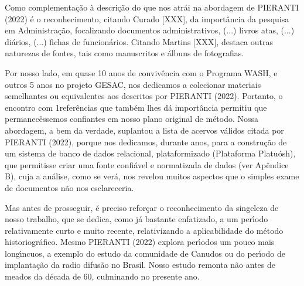 \documentclass[
12pt,		%
openright,	%
twoside,  %
a4paper,			%
chapter=TITLE,		%
english,			%
french,				%
spanish,			%
brazil				%
]{USPSC-classe/USPSC}
\begin{document}
Como complementa\c{c}\~ao \`a descri\c{c}\~ao do que nos atr\'ai na abordagem de  PIERANTI (2022) \'e o reconhecimento, citando Curado [XXX], da import\^ancia da pesquisa em Administra\c{c}\~ao, focalizando \textquotedbl documentos administrativos, (...) livros atas, (...) di\'arios, (...) fichas de funcion\'arios\textquotedbl . Citando Martins [XXX], destaca outras naturezas de fontes, tais como manuscritos e \'albuns de fotografias.

















Por nosso lado, em quase 10 anos de conviv\^encia com o Programa WASH, e outros 5 anos no projeto GESAC, nos dedicamos a colecionar materiais semelhantes ou equivalentes aos descritos por PIERANTI (2022). Portanto, o encontro com 1refer\^encias que tamb\'em lhes d\'a import\^ancia permitiu que permanec\^essemos confiantes em nosso plano original de m\'etodo. Nossa abordagem, a bem da verdade, suplantou a lista de acervos v\'alidos citada por  PIERANTI (2022), porque nos dedicamos, durante anos, para a constru\c{c}\~ao de um sistema de banco de dados relacional, plataformizado (Plataforma Platu\'osh), que permitisse criar uma fonte confi\'avel e normatizada de dados (ver Ap\^endice B), cuja a an\'alise, como se ver\'a, nos revelou muitos aspectos que o simples exame de documentos n\~ao nos esclareceria.

















Mas antes de prosseguir, \'e preciso refor\c{c}ar o reconhecimento da singeleza de nosso trabalho, que se dedica, como j\'a bastante enfatizado, a um per\'{\i}odo relativamente curto e muito recente, relativizando a aplicabilidade do m\'etodo historiogr\'afico. Mesmo  PIERANTI (2022) explora per\'{\i}odos um pouco mais long\'{\i}ncuos, a exemplo do estudo da comunidade de Canudos ou do per\'{\i}odo de implanta\c{c}\~ao da radio difus\~ao no Brasil. Nosso estudo remonta n\~ao antes de meados da d\'ecada de 60, culminando no presente ano.
\end{document}
